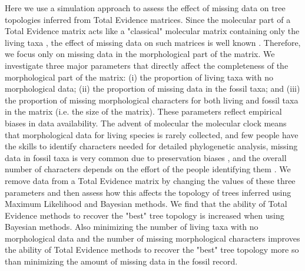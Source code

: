 \documentclass[12pt,letterpaper]{article}
\begin{document}
Here we use a simulation approach to assess the effect of missing data on tree topologies inferred from Total Evidence matrices. Since the molecular part of a Total Evidence matrix acts like a "classical" molecular matrix containing only the living taxa \citep{ronquista2012}, the effect of missing data on such matrices is well known \citep{wiensmissing2006,wiensmissing2008,lemmonthe2009,rouresite-specific2011}.
 Therefore, we focus only on missing data in the morphological part of the matrix. We investigate three major parameters that directly affect the completeness of the morphological part of the matrix: (i) the proportion of living taxa with no morphological data; (ii) the proportion of missing data in the fossil taxa; and (iii) the proportion of missing morphological characters for both living and fossil taxa in the matrix (i.e. the size of the matrix). These parameters reflect empirical biases in data availability.
The advent of molecular the molecular clock \citep{zuckerkandl1965} means that morphological data for living species is rarely collected, and few people have the skills to identify characters needed for detailed phylogenetic analysis, missing data in fossil taxa is very common due to preservation biases \citep{sansomfossilization2013}, and the overall number of characters depends on the effort of the people identifying them \citep[e.g.][]{O'Leary08022013}. We remove data from a Total Evidence matrix by changing the values of these three parameters and then assess how this affects the topology of trees inferred using Maximum Likelihood and Bayesian methods. We find that the ability of Total Evidence methods to recover the "best" tree topology is increased when using Bayesian methods. Also minimizing the number of living taxa with no morphological data and the number of missing morphological characters improves the ability of Total Evidence methods to recover the "best" tree topology more so than minimizing the amount of missing data in the fossil record.

%
%
 
\end{document}
